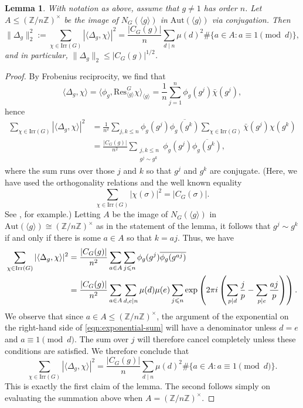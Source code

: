\documentclass[12pt]{amsart}
\newtheorem{lemma}[theorem]{Lemma}
\theoremstyle{definition} \newtheorem{definition}[theorem]{Definition}
\theoremstyle{example} \newtheorem{example}[theorem]{Example}
\theoremstyle{remark} \newtheorem{remark}{Remark}[theorem]
\numberwithin{equation}{section}
\numberwithin{theorem}{section}
\renewcommand{\leq}{\leqslant}
\begin{document}
	\begin{lemma} \label{lem:delta-l2}
		With notation as above, assume that $g \neq 1$ has order $n$.  Let $A \leq (\mathbb{Z}/n\mathbb{Z})^\times$ be the image of $N_G(\langle g\rangle)$ in $\mathrm{Aut}(\langle g \rangle)$ via conjugation.  Then
			\[
				\|\Delta_g\|_2^2
					:= \sum_{\chi \in \mathrm{Irr}(G)} |\langle \Delta_g, \chi \rangle|^2
					= \frac{|C_G(g)|}{n} \sum_{d \mid n} \mu(d)^2 \#\{a \in A : a \equiv 1 \pmod{d}\},
			\]
		and in particular, $\|\Delta_g\|_2 \leq |C_G(g)|^{1/2}$.
	\end{lemma}
	\begin{proof}
		By Frobenius reciprocity, we find that
			\[
				\langle \Delta_g, \chi \rangle
					= \langle \phi_g, \mathrm{Res}_{\langle g \rangle} ^G \chi \rangle_{\langle g \rangle}
					= \frac{1}{n} \sum_{j = 1}^n \phi_g(g^j) \bar\chi(g^j),
			\]
		hence
			\begin{align*}
				\sum_{\chi \in \mathrm{Irr}(G)} |\langle \Delta_g, \chi\rangle|^2
					&= \frac{1}{n^2} \sum_{j,k \leq n} \phi_g(g^j)\overline{\phi_g(g^k)} \sum_{\chi \in \mathrm{Irr}(G)} \bar\chi(g^j)\chi(g^k) \\
					&= \frac{|C_G(g)|}{n^2} \sum_{\substack{ j,k \leq n \\ g^j \sim g^k}} \phi_g(g^j) \overline{\phi_g(g^k)},
			\end{align*}
		where the sum runs over those $j$ and $k$ so that $g^j$ and $g^k$ are conjugate.  
		(Here, we have used the orthogonality relations and the well known equality
			\[
				\sum_{\chi \in \mathrm{Irr}(G)} |\chi(\sigma)|^2 = |C_G(\sigma)|.
			\]
		See \cite[Chapter 2 Proposition 7]{Serre-LinearRepresentations}, for example.)
		Letting $A$ be the image of $N_G(\langle g\rangle)$ in $\mathrm{Aut}(\langle g \rangle) \cong (\mathbb{Z}/n\mathbb{Z})^\times$ as in the statement of the lemma, it follows that $g^j \sim g^k$ if and only if there is some $a \in A$ so that $k = aj$.  Thus, we have 
			\begin{align} \label{eqn:exponential-sum}
				\sum_{\chi \in \mathrm{Irr}(G)} |\langle \Delta_g, \chi\rangle|^2 \notag
					&= \frac{|C_G(g)|}{n^2} \sum_{a \in A} \sum_{j \leq n} \phi_g(g^j) \overline{\phi_g(g^{aj})} \\
					&= \frac{|C_G(g)|}{n^2} \sum_{a \in A} \sum_{d,e \mid n} \mu(d)\mu(e)\sum_{j \leq n} \exp\left(2\pi i \left( \sum_{p \mid d} \frac{j}{p} - \sum_{p \mid e} \frac{aj}{p} \right)\right).
			\end{align}
		We observe that since $a \in A \leq (\mathbb{Z}/n\mathbb{Z})^\times$, the argument of the exponential on the right-hand side of \eqref{eqn:exponential-sum} will have a denominator unless $d=e$ and $a \equiv 1 \pmod{d}$.  The sum over $j$ will therefore cancel completely unless these conditions are satisfied.  We therefore conclude that
			\[
				\sum_{\chi \in \mathrm{Irr}(G)} |\langle \Delta_g, \chi\rangle|^2 
					= \frac{|C_G(g)|}{n} \sum_{d \mid n} \mu(d)^2 \#\{a \in A : a \equiv 1 \pmod{d}\}.
			\]
		This is exactly the first claim of the lemma.  The second follows simply on evaluating the summation above when $A = (\mathbb{Z}/n\mathbb{Z})^\times$.
	\end{proof}
	
\end{document}
